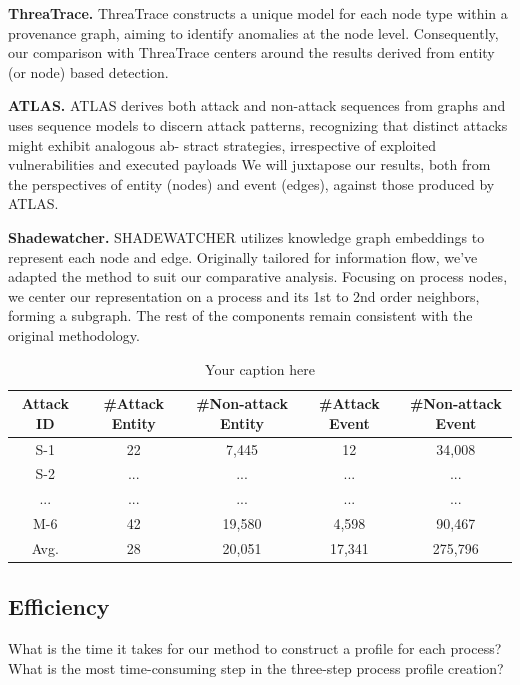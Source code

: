 \textbf{ThreaTrace.}
ThreaTrace \cite{wang2022threatrace} constructs a unique model for each node type within a provenance graph, aiming to identify anomalies at the node level. Consequently, our comparison with ThreaTrace centers around the results derived from entity (or node) based detection.

\textbf{ATLAS.}
ATLAS \cite{alsaheel2021atlas} derives both attack and non-attack sequences from
graphs and uses sequence models to discern attack patterns,
recognizing that distinct attacks might exhibit analogous ab-
stract strategies, irrespective of exploited vulnerabilities and
executed payloads
We will juxtapose our results, both from the perspectives of entity (nodes) and event (edges), against those produced by ATLAS.

\textbf{Shadewatcher.}
SHADEWATCHER \cite{zengy2022shadewatcher} utilizes knowledge graph embeddings to represent each node and edge. Originally tailored for information flow, we've adapted the method to suit our comparative analysis. Focusing on process nodes, we center our representation on a process and its 1st to 2nd order neighbors, forming a subgraph. The rest of the components remain consistent with the original methodology.


\begin{table}[htbp]
\centering
\caption{Your caption here}
\begin{tabularx}{\textwidth}{|c|c|c|c|c|}
\hline
\textbf{Attack ID} & \textbf{\#Attack Entity} & \textbf{\#Non-attack Entity} & \textbf{\#Attack Event} & \textbf{\#Non-attack Event} \\
\hline
S-1 & 22 & 7,445 & 12 & 34,008  \\
S-2 & ... & ... & ... & ...  \\
... & ... & ... & ... & ...  \\
M-6 & 42 & 19,580 & 4,598 & 90,467  \\
\hline
Avg. & 28 & 20,051 & 17,341 & 275,796 \\
\hline
\end{tabularx}
\end{table}


\subsection{Efficiency}
\label{sec-eff}
What is the time it takes for our method to construct a profile for each process? What is the most time-consuming step in the three-step process profile creation?

